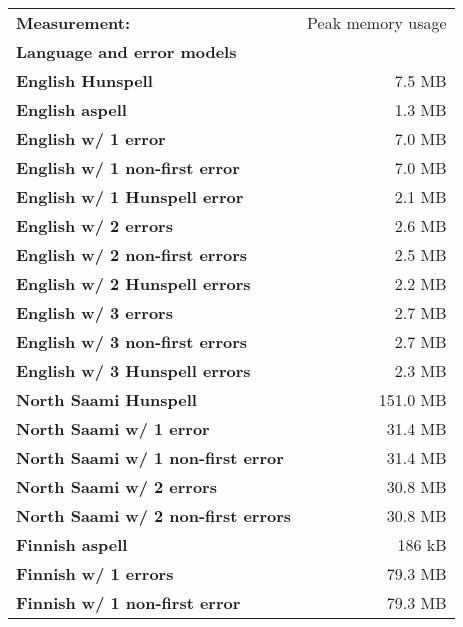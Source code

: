 \documentclass[a4paper,12pt]{article}
\begin{document}
\begin{table}
    \centering
    \begin{tabular}{|l|r|}
        \hline
        \bf Measurement:              & Peak memory usage \\
        \bf Language and error models &        \\
        \hline
        \bf English Hunspell & 7.5 MB \\
          \bf English aspell & 1.3 MB \\
        \hline
        \bf English w/ 1 error     & 7.0 MB \\
 \bf English w/ 1 non-first error  & 7.0 MB  \\
 \bf English w/ 1 Hunspell error   & 2.1 MB  \\
     \bf English w/ 2 errors       & 2.6 MB  \\
 \bf English w/ 2 non-first errors & 2.5 MB \\
 \bf English w/ 2 Hunspell errors  & 2.2 MB \\
   \bf English w/ 3 errors         & 2.7 MB \\
 \bf English w/ 3 non-first errors & 2.7 MB \\
 \bf English w/ 3 Hunspell errors  & 2.3 MB \\
        \hline
   \bf North Saami Hunspell & 151.0 MB \\
        \hline
        \bf North Saami w/ 1 error    & 31.4 MB \\
\bf North Saami w/ 1 non-first error  & 31.4 MB \\
       \bf North Saami w/ 2 errors    & 30.8 MB \\
\bf North Saami w/ 2 non-first errors & 30.8 MB \\
        \hline
        \bf Finnish aspell & 186 kB \\
        \hline
        \bf Finnish w/ 1 errors   &  79.3 MB \\
\bf Finnish w/ 1 non-first error  &  79.3 MB \\

\end{tabular}
\end{table}
\end{document}
